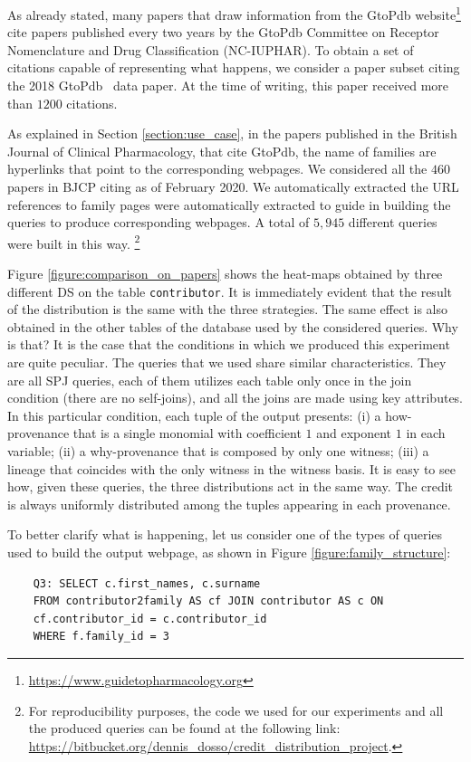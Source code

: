 As already stated, many papers that draw information from the GtoPdb website\footnote{\url{https://www.guidetopharmacology.org}} cite papers published every two years by the GtoPdb Committee on Receptor Nomenclature and Drug Classification (NC-IUPHAR).
To obtain a set of citations capable of representing what happens, we consider a paper subset citing the 2018 GtoPdb~\citep{iuphar2018} data paper. 
At the time of writing, this paper received more than $1200$ citations. 

As explained in Section \ref{section:use_case}, in the papers published in the British Journal of Clinical Pharmacology, that cite GtoPdb, the name of families are hyperlinks that point to the corresponding webpages.
We considered all the $460$ papers in BJCP citing \citep{iuphar2018} as of February 2020. 
We automatically extracted the URL references to family pages were automatically extracted to guide in building the queries to produce corresponding webpages.
A total of $5,945$ different queries were built in this way. \footnote{For reproducibility purposes, the code we used for our experiments and all the produced queries can be found at the following link: \url{https://bitbucket.org/dennis_dosso/credit_distribution_project}.}

Figure \ref{figure:comparison_on_papers} shows the heat-maps obtained by three different DS on the table \texttt{contributor}.
It is immediately evident that the result of the distribution is the same with the three strategies. The same effect is also obtained in the other tables of the database used by the considered queries. 
Why is that? 
It is the case that the conditions in which we produced this experiment are quite peculiar. The queries that we used share similar characteristics. They are all SPJ queries, each of them utilizes each table only once in the join condition (there are no self-joins), and all the joins are made using key attributes. 
In this particular condition, each tuple of the output presents: (i) a how-provenance that is a single monomial with coefficient $1$ and exponent $1$ in each variable; (ii) a why-provenance that is composed by only one witness; (iii) a lineage that coincides with the only witness in the witness basis.
It is easy to see how, given these queries, the three distributions act in the same way.
The credit is always uniformly distributed among the tuples appearing in each provenance. 

To better clarify what is happening, let us consider one of the types of queries used to build the output webpage, as shown in Figure \ref{figure:family_structure}:
\begin{verbatim}
	Q3: SELECT c.first_names, c.surname
	FROM contributor2family AS cf JOIN contributor AS c ON 
	cf.contributor_id = c.contributor_id 
	WHERE f.family_id = 3
\end{verbatim}


